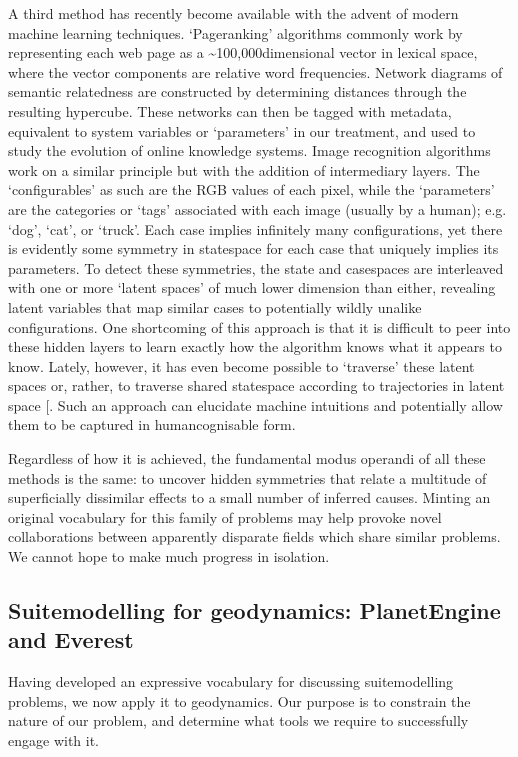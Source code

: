 \documentclass[letterpaper,10pt,english]{jupyterBook}
\begin{document}
\sphinxAtStartPar
A third method has recently become available with the advent of modern machine learning techniques. ‘Page\sphinxhyphen{}ranking’ algorithms commonly work by representing each web page as a \textasciitilde{}100,000\sphinxhyphen{}dimensional vector in lexical space, where the vector components are relative word frequencies. Network diagrams of semantic relatedness are constructed by determining distances through the resulting hypercube. These networks can then be tagged with metadata, equivalent to system variables or ‘parameters’ in our treatment, and used to study the evolution of online knowledge systems. Image recognition algorithms work on a similar principle but with the addition of intermediary layers. The ‘configurables’ as such are the RGB values of each pixel, while the ‘parameters’ are the categories or ‘tags’ associated with each image (usually by a human); e.g. ‘dog’, ‘cat’, or ‘truck’. Each case implies infinitely many configurations, yet there is evidently some symmetry in state\sphinxhyphen{}space for each case that uniquely implies its parameters. To detect these symmetries, the state\sphinxhyphen{} and case\sphinxhyphen{}spaces are interleaved with one or more ‘latent spaces’ of much lower dimension than either, revealing latent variables that map similar cases to potentially wildly unalike configurations. One shortcoming of this approach is that it is difficult to peer into these hidden layers to learn exactly how the algorithm knows what it appears to know. Lately, however, it has even become possible to ‘traverse’ these latent spaces \sphinxhyphen{} or, rather, to traverse shared state\sphinxhyphen{}space according to trajectories in latent space {[}\sphinxcite{references:id55}{]}. Such an approach can elucidate machine intuitions and potentially allow them to be captured in human\sphinxhyphen{}cognisable form.

\sphinxAtStartPar
Regardless of how it is achieved, the fundamental modus operandi of all these methods is the same: to uncover hidden symmetries that relate a multitude of superficially dissimilar effects to a small number of inferred causes. Minting an original vocabulary for this family of problems may help provoke novel collaborations between apparently disparate fields which share similar problems. We cannot hope to make much progress in isolation.


\subsection{Suite\sphinxhyphen{}modelling for geodynamics: PlanetEngine and Everest}
\label{\detokenize{content/chapter_02_methods/section3:suite-modelling-for-geodynamics-planetengine-and-everest}}
\sphinxAtStartPar
Having developed an expressive vocabulary for discussing suite\sphinxhyphen{}modelling problems, we now apply it to geodynamics. Our purpose is to constrain the nature of our problem, and determine what tools we require to successfully engage with it.
\end{document}

